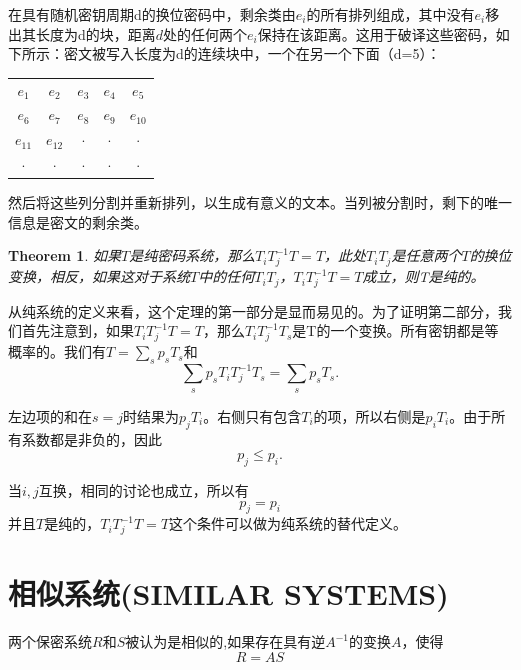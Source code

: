 \documentclass[]{article}
\newtheorem{theorem}{Theorem}
\begin{document}
在具有随机密钥周期d的换位密码中，剩余类由$e_i$的所有排列组成，其中没有$e_i$移出其长度为d的块，距离$d$处的任何两个$e_i$保持在该距离。这用于破译这些密码，如下所示：密文被写入长度为d的连续块中，一个在另一个下面（d=5）：\par
\begin{center}
	\begin{tabular}{c c c c c }
		
		$e_1$& $e_2$ & $e_3$ & $e_4$ & $e_5$ \\ 
		
		$e_6$& $e_7$ & $e_8$ & $e_9$ & $e_{10}$ \\ 
		
		$e_{11}$& $e_{12}$ & $\cdot$ & $\cdot$ & $\cdot$ \\ 
		
		$\cdot$& $\cdot$ & $\cdot$ & $\cdot$ & $\cdot$ \\ 
		
	\end{tabular} 
\end{center}

然后将这些列分割并重新排列，以生成有意义的文本。当列被分割时，剩下的唯一信息是密文的剩余类。

\begin{theorem}
	如果$T$是纯密码系统，那么$T_i T^{-1}_j T= T$，此处$T_iT_j$是任意两个$T$的换位变换，相反，如果这对于系统$T$中的任何$T_iT_j$，$T_i T^{-1}_j T= T$成立，则T是纯的。
\end{theorem}

从纯系统的定义来看，这个定理的第一部分是显而易见的。为了证明第二部分，我们首先注意到，如果$T_i T^{-1}_j T= T$，那么$T_i T^{-1}_j T_s$是T的一个变换。所有密钥都是等概率的。我们有$T=\sum_{s}p_sT_s$和
\[\sum_{s} p_sT_iT^{-1}_jT_s = \sum_{s}p_sT_s.\]

左边项的和在$s=j$时结果为$p_jT_i$。右侧只有包含$T_i$的项，所以右侧是$p_iT_i$。由于所有系数都是非负的，因此
\[p_j\leq p_i.\]

当$i,j$互换，相同的讨论也成立，所以有
\[p_j = p_i\]
并且$T$是纯的，$T_iT^{-1}_jT=T$这个条件可以做为纯系统的替代定义。

\newpage
%   
%

\section{相似系统(SIMILAR SYSTEMS)}

两个保密系统$R$和$S$被认为是相似的,如果存在具有逆$A^{-1}$的变换$A$，使得
\[R=AS\]
\end{document}
